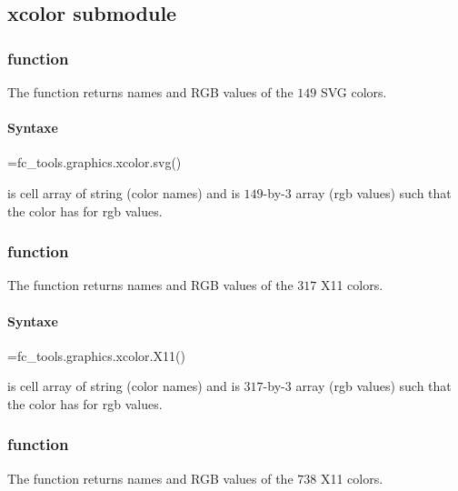 \subsection{xcolor submodule}

\subsubsection[fc\_tools.graphics.xcolor.svg function]{ function}
The  function returns names and RGB values of the $149$ SVG colors.

\paragraph{Syntaxe}
\begin{syntaxe}
=fc_tools.graphics.xcolor.svg()
\end{syntaxe}

 is cell array of string (color names) and  is $149$-by-$3$ array (rgb values)
such that the color  has  for rgb values.

\subsubsection[fc\_tools.graphics.xcolor.X11 function]{ function}
The  function returns names and RGB values of the $317$ X11 colors.

\paragraph{Syntaxe}
\begin{syntaxe}
=fc_tools.graphics.xcolor.X11()
\end{syntaxe}

 is cell array of string (color names) and  is $317$-by-$3$ array (rgb values)
such that the color  has  for rgb values.

\subsubsection[fc\_tools.graphics.xcolor.fullX11 function]{ function}
The  function returns names and RGB values of the $738$ X11 colors.

